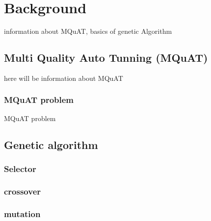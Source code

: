 \chapter{Background}
information about MQuAT, basics of genetic Algorithm

\section{Multi Quality Auto Tunning (MQuAT)}
here will be information about MQuAT
\subsection{MQuAT problem}

MQuAT problem
     
\section{Genetic algorithm}

\subsection{Selector}

\subsection{crossover}
\subsection{mutation}

